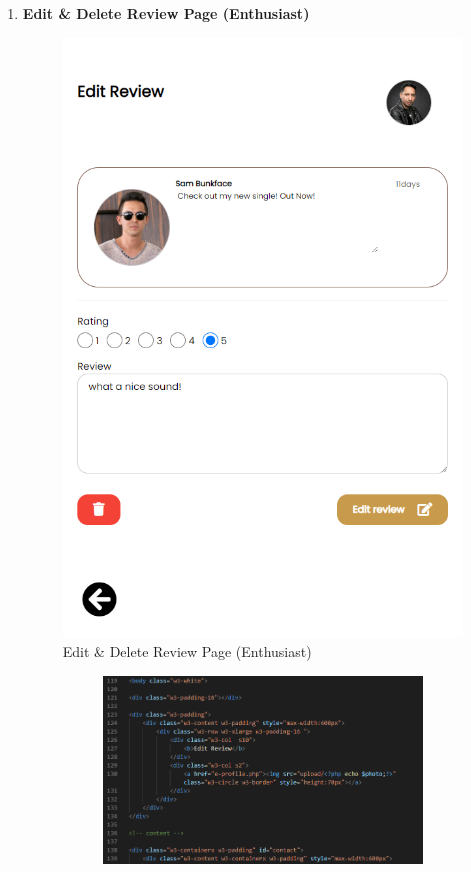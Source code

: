 \begin{enumerate}[1.]
    \item \textbf{Edit \& Delete Review Page (Enthusiast)}
    \begin{figure}[h]
        \centering
        \includegraphics[width=0.5\linewidth]{mainmatter/images/frontend/ss/Edit-Delete Review (Enthusiast).png}
        \caption{Edit \& Delete Review Page (Enthusiast)}
        \label{fig:myfig66}
    \end{figure}
    \begin{figure}[h]\ContinuedFloat
        \centering
        \begin{subfigure}[b]{0.7\textwidth}
            \centering
            \includegraphics[width=\textwidth]{mainmatter/images/frontend/code/eeditereview.png}
            \label{fig:sub1}
        \end{subfigure}
        \hspace{0.04\textwidth}
        \begin{subfigure}[b]{0.6\textwidth}

\end{subfigure}
\end{figure}
\end{enumerate}
